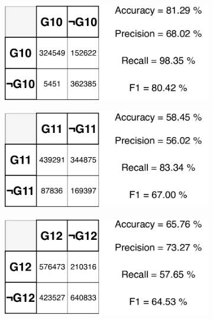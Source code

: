 \begin{figure}[H]
\vspace{3mm}
\begin{subfigure}{.33\textwidth}
  \centering
  \includegraphics[width=\textwidth]{tex/images/results/rese_g10_512}  
\end{subfigure}%
\begin{subfigure}{.33\textwidth}
  \centering
  \includegraphics[width=\textwidth]{tex/images/results/rese_g11_512}
\end{subfigure}
\begin{subfigure}{.33\textwidth}
  \centering
  \includegraphics[width=\textwidth]{tex/images/results/rese_g12_512}
\end{subfigure}


\end{figure}
